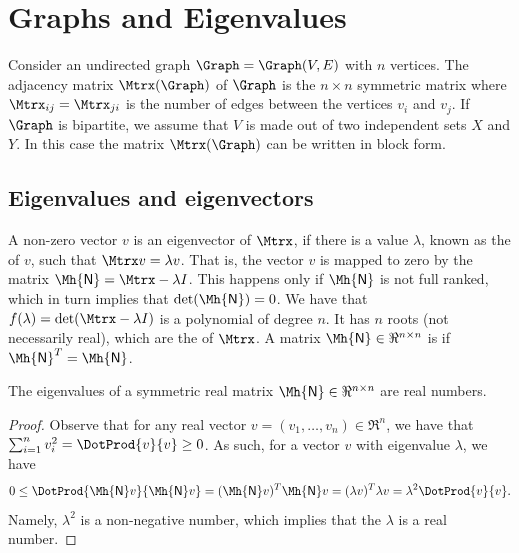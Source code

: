 
\makeatletter
{}
\makeatother
\ifx\bookMode\undefined%
\fi





\ChapterPrefix{}
\ChapterGen{}



\section{Graphs and Eigenvalues}

Consider an undirected graph $\Graph = \Graph(V,E)$ with $n$
vertices. The adjacency matrix $\Mtrx(\Graph)$ of $\Graph$ is the $n\times
n$ symmetric matrix where $\Mtrx_{ij} = \Mtrx_{ji}$ is the number of
edges between the vertices $v_i$ and $v_j$. If $\Graph$ is bipartite,
we assume that $V$ is made out of two independent sets $X$ and $Y$. In
this case the matrix $\Mtrx(\Graph)$ can be written in block form.

\newcommand{\MA}{\Mh{\mathsf{N}}}%
\subsection{Eigenvalues and eigenvectors}

A non-zero vector $v$ is an eigenvector of $\Mtrx$, if there is a
value $\lambda$, known as the  of $v$, such that
$\Mtrx v = \lambda v$. That is, the vector $v$ is mapped to zero by
the matrix $\MA = \Mtrx - \lambda I$. This happens only if $\MA$ is
not full ranked, which in turn implies that $\det(\MA)=0$. We have
that $f(\lambda ) =\det(\Mtrx - \lambda I)$ is a polynomial of degree
$n$. It has $n$ roots (not necessarily real), which are the
 of $\Mtrx$. A matrix $\MA \in \Re^{n\times n}$ is
 if $\MA^T = \MA$.

\begin{lemma}
    The eigenvalues of a symmetric real matrix $\MA \in \Re^{n \times
       n}$ are real numbers.
\end{lemma}
\begin{proof}
    Observe that for any real vector $v=(v_1, \ldots, v_n) \in \Re^n$,
    we have that $\sum_{i=1}^n v_i^2 = \DotProd{v}{v} \geq 0$. As
    such, for a vector $v$ with eigenvalue $\lambda$, we have
    \begin{equation*}
        0 \leq 
        \DotProd{ \MA v}{\MA v} = (\MA v)^T \MA v
        = (\lambda v)^T \lambda v
        = \lambda^2 \DotProd{v}{v}.
    \end{equation*}
    Namely, $\lambda^2$ is a non-negative number, which implies that
    the $\lambda$ is a real number.
\end{proof}

